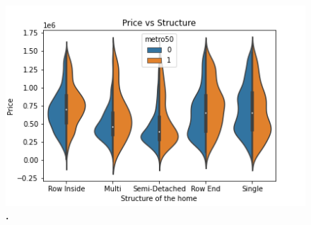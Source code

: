 \documentclass[12pt]{report}
\begin{document}
\begin{figure}[h]
\begin{center}
\includegraphics[width=130mm]{structureViolin.png}
\end{center}
\caption{\textbf{.}}
\label{fig:strHist}
\end{figure}


\clearpage
\end{document}
